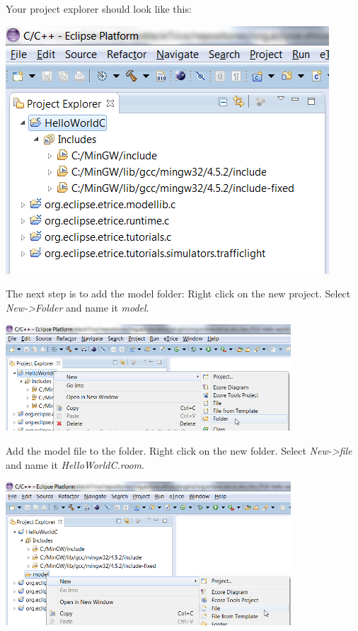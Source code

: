Your project explorer should look like this:

\includegraphics{images/016-HelloWorldC01.png}

The next step is to add the model folder:
Right click on the new project. Select \textit{New->Folder} and name it \textit{model}.

\includegraphics[width=0.8\textwidth]{images/016-HelloWorldC02.png}

Add the model file to the folder. Right click on the new folder. Select \textit{New->file} and name it 
\textit{HelloWorldC.room}.

\includegraphics[width=0.8\textwidth]{images/016-HelloWorldC03.png}

